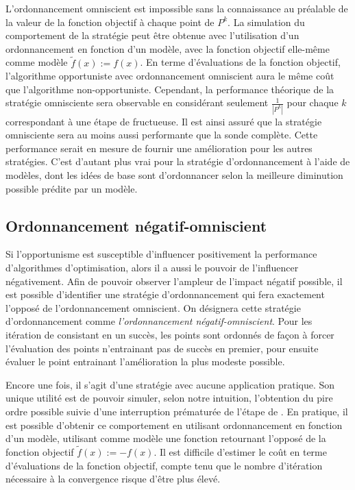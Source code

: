 L'ordonnancement omniscient est impossible sans la connaissance au préalable de la valeur de la fonction objectif à chaque point de $P^k$.
La simulation du comportement de la stratégie peut être obtenue avec l'utilisation d'un ordonnancement en fonction d'un modèle, avec la fonction objectif elle-même comme modèle $\tilde{f}(x):=f(x)$. En terme d'évaluations de la fonction objectif, l'algorithme opportuniste avec ordonnancement omniscient aura le même coût que l'algorithme non-opportuniste. Cependant, la performance théorique de la stratégie omnisciente sera observable en considérant seulement $\frac{1}{|P^k|}$ pour chaque $k$ correspondant à une étape de \POLL fructueuse. Il est ainsi assuré que la stratégie omnisciente sera au moins aussi performante que la sonde complète. Cette performance serait en mesure de fournir une amélioration pour les autres stratégies. C'est d'autant plus vrai pour la stratégie d'ordonnancement à l'aide de modèles, dont les idées de base sont d'ordonnancer selon la meilleure diminution possible prédite par un modèle.
\subsection{Ordonnancement négatif-omniscient}\label{sec:neg}
Si l'opportunisme est susceptible d'influencer positivement la performance d'algorithmes d'optimisation, alors il a aussi le pouvoir de l'influencer négativement. Afin de pouvoir observer l'ampleur de l'impact négatif possible, il est possible d'identifier une stratégie d'ordonnancement qui fera exactement l'opposé de l'ordonnancement omniscient. On désignera cette stratégie d'ordonnancement comme \emph{l'ordonnancement négatif-omniscient}. Pour les itération de \POLL consistant en un succès, les points sont ordonnés de façon à forcer l'évaluation des points n'entrainant pas de succès en premier, pour ensuite évaluer le point entrainant l'amélioration la plus modeste possible.  
  
Encore une fois, il s'agit d'une stratégie avec aucune application pratique. Son unique utilité est de pouvoir simuler, selon notre intuition, l'obtention du pire ordre possible suivie d'une interruption prématurée de l'étape de \POLL. En pratique, il est possible d'obtenir ce comportement en utilisant ordonnancement en fonction d'un modèle, utilisant comme modèle une fonction retournant l'opposé de la fonction objectif $\tilde{f}(x):=-f(x)$. Il est difficile d'estimer le coût en terme d'évaluations de la fonction objectif, compte tenu que le nombre d'itération nécessaire à la convergence risque d'être plus élevé.  

